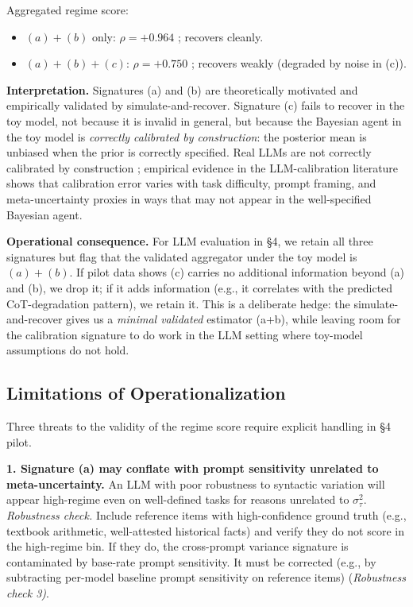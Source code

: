 \documentclass{article}
\providecommand{\tightlist}{\setlength{\itemsep}{0pt}\setlength{\parskip}{0pt}}
\begin{document}
Aggregated regime score:

\begin{itemize}
\tightlist
\item
  \((a) + (b)\) only: \(\rho = + 0.964\) ; recovers cleanly.
\item
  \((a) + (b) + (c)\): \(\rho = + 0.750\) ; recovers weakly (degraded by
  noise in (c)).
\end{itemize}

\textbf{Interpretation.} Signatures (a) and (b) are theoretically
motivated and empirically validated by simulate-and-recover. Signature
(c) fails to recover in the toy model, not because it is invalid in
general, but because the Bayesian agent in the toy model is
\emph{correctly calibrated by construction}: the posterior mean is
unbiased when the prior is correctly specified. Real LLMs are not
correctly calibrated by construction \cite{desai2020, jiang2021}; empirical evidence in the LLM-calibration literature shows
that calibration error varies with task difficulty, prompt framing, and
meta-uncertainty proxies in ways that may not appear in the
well-specified Bayesian agent.

\textbf{Operational consequence.} For LLM evaluation in \S{}4, we retain
all three signatures but flag that the validated aggregator under the
toy model is \((a) + (b)\). If pilot data shows (c) carries no
additional information beyond (a) and (b), we drop it; if it adds
information (e.g., it correlates with the predicted CoT-degradation
pattern), we retain it. This is a deliberate hedge: the
simulate-and-recover gives us a \emph{minimal validated} estimator
(a+b), while leaving room for the calibration signature to do work in
the LLM setting where toy-model assumptions do not hold.

\subsection{Limitations of
Operationalization}\label{limitations-of-operationalization}

Three threats to the validity of the regime score require explicit
handling in \S{}4 pilot.

\textbf{1. Signature (a) may conflate with prompt sensitivity unrelated
to meta-uncertainty.} An LLM with poor robustness to syntactic variation
will appear high-regime even on well-defined tasks for reasons unrelated
to \(\sigma_{\tau}^{2}\). \emph{Robustness check.} Include reference
items with high-confidence ground truth (e.g., textbook arithmetic,
well-attested historical facts) and verify they do not score in the
high-regime bin. If they do, the cross-prompt variance signature is
contaminated by base-rate prompt sensitivity. It must be corrected
(e.g., by subtracting per-model baseline prompt sensitivity on reference
items) (\emph{Robustness check 3)}.
\end{document}
